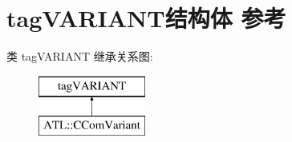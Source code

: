 \hypertarget{structtag_v_a_r_i_a_n_t}{}\section{tag\+V\+A\+R\+I\+A\+N\+T结构体 参考}
\label{structtag_v_a_r_i_a_n_t}
类 tag\+V\+A\+R\+I\+A\+NT 继承关系图\+:\begin{figure}[H]
\begin{center}
\leavevmode
\includegraphics[height=2.000000cm]{structtag_v_a_r_i_a_n_t}
\end{center}
\end{figure}
